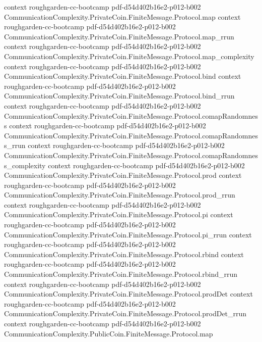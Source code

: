 \begin{theorem}
  {context}
  {roughgarden-cc-bootcamp}
  {pdf-d54d402b16e2-p012-b002}
\proofstep
  {CommunicationComplexity.PrivateCoin.FiniteMessage.Protocol.map}
  {context}
  {roughgarden-cc-bootcamp}
  {pdf-d54d402b16e2-p012-b002}
\proofstep
  {CommunicationComplexity.PrivateCoin.FiniteMessage.Protocol.map_rrun}
  {context}
  {roughgarden-cc-bootcamp}
  {pdf-d54d402b16e2-p012-b002}
\proofstep
  {CommunicationComplexity.PrivateCoin.FiniteMessage.Protocol.map_complexity}
  {context}
  {roughgarden-cc-bootcamp}
  {pdf-d54d402b16e2-p012-b002}
\proofstep
  {CommunicationComplexity.PrivateCoin.FiniteMessage.Protocol.bind}
  {context}
  {roughgarden-cc-bootcamp}
  {pdf-d54d402b16e2-p012-b002}
\proofstep
  {CommunicationComplexity.PrivateCoin.FiniteMessage.Protocol.bind_rrun}
  {context}
  {roughgarden-cc-bootcamp}
  {pdf-d54d402b16e2-p012-b002}
\proofstep
  {CommunicationComplexity.PrivateCoin.FiniteMessage.Protocol.comapRandomness}
  {context}
  {roughgarden-cc-bootcamp}
  {pdf-d54d402b16e2-p012-b002}
\proofstep
  {CommunicationComplexity.PrivateCoin.FiniteMessage.Protocol.comapRandomness_rrun}
  {context}
  {roughgarden-cc-bootcamp}
  {pdf-d54d402b16e2-p012-b002}
\proofstep
  {CommunicationComplexity.PrivateCoin.FiniteMessage.Protocol.comapRandomness_complexity}
  {context}
  {roughgarden-cc-bootcamp}
  {pdf-d54d402b16e2-p012-b002}
\proofstep
  {CommunicationComplexity.PrivateCoin.FiniteMessage.Protocol.prod}
  {context}
  {roughgarden-cc-bootcamp}
  {pdf-d54d402b16e2-p012-b002}
\proofstep
  {CommunicationComplexity.PrivateCoin.FiniteMessage.Protocol.prod_rrun}
  {context}
  {roughgarden-cc-bootcamp}
  {pdf-d54d402b16e2-p012-b002}
\proofstep
  {CommunicationComplexity.PrivateCoin.FiniteMessage.Protocol.pi}
  {context}
  {roughgarden-cc-bootcamp}
  {pdf-d54d402b16e2-p012-b002}
\proofstep
  {CommunicationComplexity.PrivateCoin.FiniteMessage.Protocol.pi_rrun}
  {context}
  {roughgarden-cc-bootcamp}
  {pdf-d54d402b16e2-p012-b002}
\proofstep
  {CommunicationComplexity.PrivateCoin.FiniteMessage.Protocol.rbind}
  {context}
  {roughgarden-cc-bootcamp}
  {pdf-d54d402b16e2-p012-b002}
\proofstep
  {CommunicationComplexity.PrivateCoin.FiniteMessage.Protocol.rbind_rrun}
  {context}
  {roughgarden-cc-bootcamp}
  {pdf-d54d402b16e2-p012-b002}
\proofstep
  {CommunicationComplexity.PrivateCoin.FiniteMessage.Protocol.prodDet}
  {context}
  {roughgarden-cc-bootcamp}
  {pdf-d54d402b16e2-p012-b002}
\proofstep
  {CommunicationComplexity.PrivateCoin.FiniteMessage.Protocol.prodDet_rrun}
  {context}
  {roughgarden-cc-bootcamp}
  {pdf-d54d402b16e2-p012-b002}
\proofstep
  {CommunicationComplexity.PublicCoin.FiniteMessage.Protocol.map}

\end{theorem}

